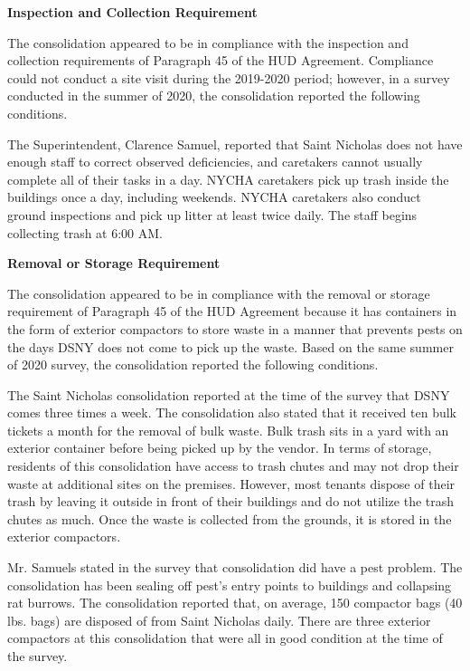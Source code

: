  

\textbf{Inspection and Collection Requirement} 

 

The consolidation appeared to be in compliance with the inspection and collection requirements of Paragraph 45 of the HUD Agreement. Compliance could not conduct a site visit during the 2019-2020 period; however, in a survey conducted in the summer of 2020, the consolidation reported the following conditions.

The Superintendent, Clarence Samuel, reported that Saint Nicholas does not have enough staff to correct observed deficiencies, and caretakers cannot usually complete all of their tasks in a day. NYCHA caretakers pick up trash inside the buildings once a day, including weekends. NYCHA caretakers also conduct ground inspections and pick up litter at least twice daily. The staff begins collecting trash at 6:00 AM.

\textbf{Removal or Storage Requirement} 

The consolidation appeared to be in compliance with the removal or storage requirement of Paragraph  45 of the HUD Agreement because it has containers in the form of exterior compactors to store waste in a manner that prevents pests on the days DSNY does not come to pick up the waste. Based on the same summer of  2020  survey, the consolidation reported the following conditions.

  

The Saint Nicholas consolidation reported at the time of the survey that DSNY comes three times a week. The consolidation also stated that it received ten bulk tickets a month for the removal of bulk waste. Bulk trash sits in a yard with an exterior container before being picked up by the vendor.  In terms of storage, residents of this consolidation have access to trash chutes and may not drop their waste at additional sites on the premises.  However, most tenants dispose of their trash by leaving it outside in front of their buildings and do not utilize the trash chutes as much. Once the waste is collected from the grounds, it is stored in the exterior compactors.  

 

Mr. Samuels stated in the survey that consolidation did have a pest problem. The consolidation has been sealing off pest's entry points to buildings and collapsing rat burrows. The consolidation reported that, on average, 150 compactor bags (40 lbs. bags)  are disposed of from Saint Nicholas daily. There are three exterior compactors at this consolidation that were all in good condition at the time of the survey.  

